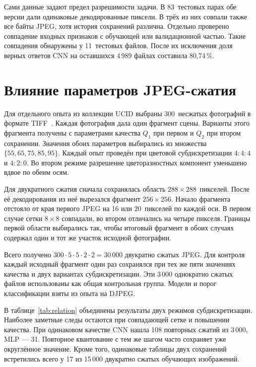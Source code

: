 Сами данные задают предел разрешимости задачи. В 83~тестовых парах обе версии дали одинаковые декодированные пиксели. В трёх из них совпали также все байты JPEG, хотя история сохранений различна. Отдельно проверено совпадение входных признаков с обучающей или валидационной частью. Такие совпадения обнаружены у 11~тестовых файлов. После их исключения доля верных ответов CNN на оставшихся 4\,989 файлах составила 80,74\,\%.

\section{Влияние параметров JPEG-сжатия}

Для отдельного опыта из коллекции UCID выбраны 300~несжатых фотографий в формате TIFF~\cite{ucid,ucid_files}. Каждая фотография дала один фрагмент сцены. Варианты этого фрагмента получены с параметрами качества $Q_1$ при первом и $Q_2$ при втором сохранении. Значения обоих параметров выбирались из множества $\{55,65,75,85,95\}$. Каждый опыт проведён при цветовой субдискретизации $4{:}4{:}4$ и $4{:}2{:}0$. Во втором режиме разрешение цветоразностных компонент уменьшено вдвое по обеим осям.

Для двукратного сжатия сначала сохранялась область $288\times288$~пикселей. После её декодирования из неё вырезался фрагмент $256\times256$. Начало фрагмента отстояло от края первого JPEG на 16 или 20~пикселей по каждой оси. В первом случае сетки $8\times8$ совпадали, во втором отличались на четыре пикселя. Границы первой области выбирались так, чтобы итоговый фрагмент в обоих случаях содержал один и тот же участок исходной фотографии.

Всего получено $300\cdot5\cdot5\cdot2\cdot2=30\,000$ двукратно сжатых JPEG. Для контроля каждый исходный фрагмент один раз сохранялся при тех же пяти значениях качества и двух вариантах субдискретизации. Эти 3\,000 однократно сжатых файлов использованы как общая контрольная группа. Модели и порог классификации взяты из опыта на DJPEG.

В таблице~\ref{tab:relation} объединены результаты двух режимов субдискретизации. Наиболее заметные следы остаются при совпадающей сетке и повышении качества. При одинаковом качестве CNN нашла 108 повторных сжатий из 3\,000, MLP --- 31. Повторное квантование с тем же шагом часто сохраняет уже округлённое значение. Кроме того, одинаковые таблицы двух сохранений встретились всего у 17 из 15\,000 двукратно сжатых обучающих изображений.

